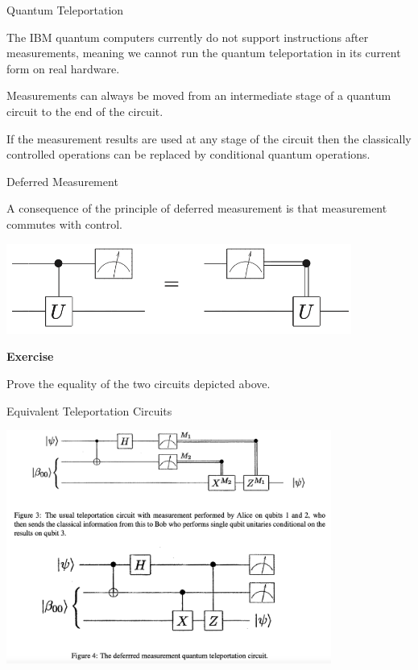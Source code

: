 \begin{frame}{Quantum Teleportation}

\bigskip

The IBM quantum computers currently do not support instructions after measurements, meaning we cannot run the quantum teleportation in its current form on real hardware. 

\bigskip

\begin{definition}
Measurements can always be moved from an intermediate stage of a quantum circuit to the end of the circuit.

If the measurement results are used at any stage of the circuit then the \alert{classically controlled operations} can be replaced by \alert{conditional quantum operations}.
\end{definition}

\end{frame}

\begin{frame}{Deferred Measurement}
 
 A consequence of the principle of deferred measurement is that \alert{measurement commutes with control}.
 
 \bigskip
 
\begin{center}
    \includegraphics[width=0.85\textwidth]{img/DeferredMeasure.png}
\end{center}

\bigskip

\textbf{Exercise}

Prove the equality of the two circuits depicted above.


\end{frame}

\begin{frame}{Equivalent Teleportation Circuits}
 
\begin{center}
    \includegraphics[width=0.80\textwidth]{img/EqivTelCircuits.png}
\end{center}
\end{frame}

